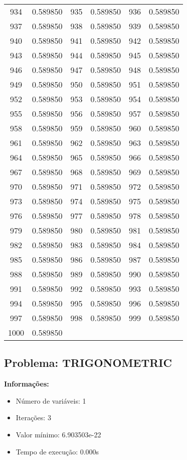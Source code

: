 \documentclass[12pt]{article}
\begin{document}
\begin{longtable}{@{}cc|cc|cc@{}}
934 & 0.589850 & 935 & 0.589850 & 936 & 0.589850 \\
937 & 0.589850 & 938 & 0.589850 & 939 & 0.589850 \\
940 & 0.589850 & 941 & 0.589850 & 942 & 0.589850 \\
943 & 0.589850 & 944 & 0.589850 & 945 & 0.589850 \\
946 & 0.589850 & 947 & 0.589850 & 948 & 0.589850 \\
949 & 0.589850 & 950 & 0.589850 & 951 & 0.589850 \\
952 & 0.589850 & 953 & 0.589850 & 954 & 0.589850 \\
955 & 0.589850 & 956 & 0.589850 & 957 & 0.589850 \\
958 & 0.589850 & 959 & 0.589850 & 960 & 0.589850 \\
961 & 0.589850 & 962 & 0.589850 & 963 & 0.589850 \\
964 & 0.589850 & 965 & 0.589850 & 966 & 0.589850 \\
967 & 0.589850 & 968 & 0.589850 & 969 & 0.589850 \\
970 & 0.589850 & 971 & 0.589850 & 972 & 0.589850 \\
973 & 0.589850 & 974 & 0.589850 & 975 & 0.589850 \\
976 & 0.589850 & 977 & 0.589850 & 978 & 0.589850 \\
979 & 0.589850 & 980 & 0.589850 & 981 & 0.589850 \\
982 & 0.589850 & 983 & 0.589850 & 984 & 0.589850 \\
985 & 0.589850 & 986 & 0.589850 & 987 & 0.589850 \\
988 & 0.589850 & 989 & 0.589850 & 990 & 0.589850 \\
991 & 0.589850 & 992 & 0.589850 & 993 & 0.589850 \\
994 & 0.589850 & 995 & 0.589850 & 996 & 0.589850 \\
997 & 0.589850 & 998 & 0.589850 & 999 & 0.589850 \\
1000 & 0.589850 &  &  &  &  \\

\end{longtable}


\newpage            
\subsection{Problema: TRIGONOMETRIC}

\textbf{Informações:}
\begin{itemize}
\item Número de variáveis: 1
\item Iterações: 3
\item Valor mínimo: 6.903503e-22
\item Tempo de execução: 0.000s
\end{itemize}
\end{document}
